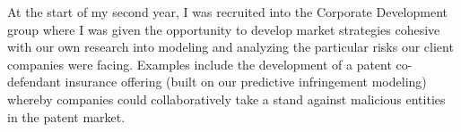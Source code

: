 At the start of my second year, I was recruited into the Corporate Development group where I was given the opportunity to develop market strategies cohesive with our own research into modeling and analyzing the particular risks our client companies were facing. Examples include the development of a patent co-defendant insurance offering (built on our predictive infringement modeling) whereby companies could collaboratively take a stand against malicious entities in the patent market. 